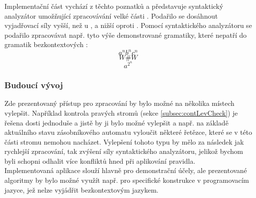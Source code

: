Implementační část vychází z těchto poznatků a představuje syntaktický analyzátor
umožňující zpracovávání velké části . Podařilo se
dosáhnout vyjadřovací síly vyšší, než u ,
a nižší oproti .
Pomocí syntaktického analyzátoru se podařilo zpracovávat např. tyto
výše demonstrované gramatiky, které nepatří do gramatik
bezkontextových \cite[str. 29]{Koutny}:
\[ a^nb^nc^n \]
\[ W\#W \]
\[ a^{2^n} \]
\subsubsection*{Budoucí vývoj}

Zde prezentovaný přístup pro zpracování  by
bylo možné na několika místech vylepšit. Například kontrola pravých stromů
(sekce \ref{subsec:contLevCheck}) je řešena dosti jednoduše a jistě by ji bylo možné
vylepšit a např. na základě aktuálního stavu zásobníkového automatu vyloučit některé
řetězce, které se v této části stromu nemohou nacházet.
Vylepšení tohoto typu by mělo za následek jak rychlejší zpracování, tak zvýšení síly
syntaktického analyzátoru, jelikož bychom byli schopni odhalit více konfliktů
hned při aplikování pravidla.\\

Implementovaná aplikace slouží hlavně pro demonstrační účely, ale prezentované
algoritmy by bylo možné využít např. pro specifické konstrukce v programovacím
jazyce, jež nelze vyjádřit bezkontextovým jazykem.

